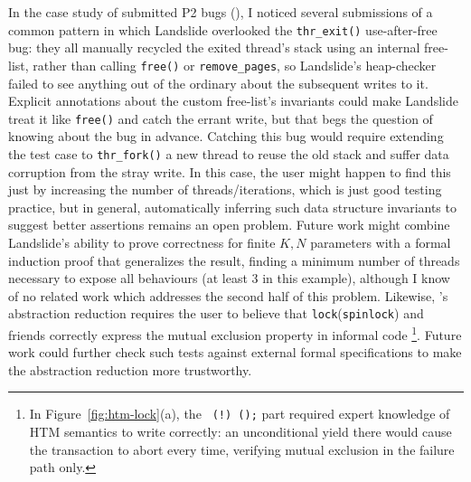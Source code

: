 In the case study of submitted P2 bugs (\sect{\ref{sec:education-eval-bug-case-study}}),
I noticed several submissions of a common pattern
in which Landslide overlooked the {\tt thr\_exit()} use-after-free bug:
they all manually recycled the exited thread's stack using an internal free-list,
rather than calling {\tt free()} or {\tt remove\_pages},
so Landslide's heap-checker failed to see anything out of the ordinary about the subsequent writes to it.
Explicit annotations about the custom free-list's invariants could make Landslide treat it like {\tt free()}
and catch the errant write,
but that begs the question of knowing about the bug in advance.
Catching this bug would require extending the test case to {\tt thr\_fork()} a new thread
to reuse the old stack and suffer data corruption from the stray write.
In this case, the user might happen to find this just by increasing the number of threads/iterations,
which is just good testing practice,
but in general, automatically inferring such data structure invariants
to suggest better assertions
remains an open problem.
Future work might combine Landslide's ability to prove correctness for finite $K,N$ parameters
with a formal induction proof that generalizes the result,
finding a minimum number of threads necessary to expose all behaviours
(at least 3 in this example),
although I know of no related work which addresses the second half of this problem.
Likewise, \sect{\ref{sec:tm-abstraction}}'s abstraction reduction requires the user
to believe that {\tt lock}({\tt spinlock}) and friends correctly express the mutual exclusion property in informal code%
\footnote{In Figure~\ref{fig:htm-lock}(a), the
{\tt {} (!) ();}
part required expert knowledge of HTM semantics to write correctly:
an unconditional yield there
would cause %
the transaction to abort every time,
verifying mutual exclusion in the failure path only.}.
Future work could further check such tests against external formal specifications
to make the abstraction reduction more trustworthy.


